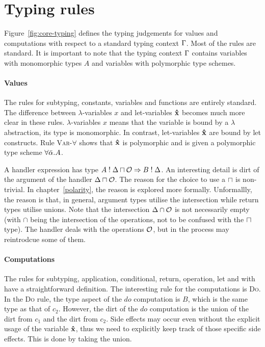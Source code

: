 
\section{Typing rules}\label{typingrules}
Figure~\ref{fig:core-typing} defines the typing judgements for values and computations with respect to a standard typing context $\Gamma$. Most of the rules are standard. It is important to note that the typing context $\Gamma$ contains variables with monomorphic types $A$ and variables with polymorphic type schemes.

\paragraph{Values}
The rules for subtyping, constants, variables and functions are entirely standard. The difference between $\lambda$-variables $x$ and let-variables $\textbf{\^{x}}$ becomes much more clear in these rules. $\lambda$-variables $x$ means that the variable is bound by a $\lambda$ abstraction, its type is monomorphic. In contrast, let-variables $\textbf{\^{x}}$ are bound by let constructs. Rule \textsc{Var-$\forall$} shows that $\textbf{\^{x}}$ is polymorphic and is given a polymorphic type scheme $\forall \bar{\alpha} . A$. 
 
A handler expression has type $A \mathrel{!} \Delta \sqcap \mathcal{O} \Rightarrow B \mathrel{!} \Delta$. An interesting detail is dirt of the argument of the handler $\Delta \sqcap \mathcal{O}$. The reason for the choice to use a $\sqcap$ is non-trivial. In chapter~\ref{polarity}, the reason is explored more formally. Unformallly, the reason is that, in general, argument types utilise the intersection while return types utilise unions. Note that the intersection $\Delta \cap \mathcal{O}$ is not necessarily empty (with $\cap$ being the intersection of the operations, not to be confused with the $\sqcap$ type). The handler deals with the operations $\mathcal{O}$, but in the process may reintrodcue some of them.

\paragraph{Computations}
The rules for subtyping, application, conditional, return, operation, let and with have a straightforward definition. The interesting rule for the computations is \textsc{Do}. In the \textsc{Do} rule, the type aspect of the $do$ computation is $B$, which is the same type as that of $c_2$. However, the dirt of the $do$ computation is the union of the dirt from $c_1$ and the dirt from $c_2$. Side effects may occur even without the explicit usage of the variable $\textbf{\^{x}}$, thus we need to explicitly keep track of those specific side effects. This is done by taking the union.

